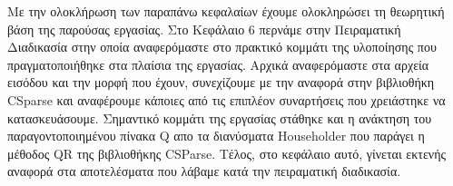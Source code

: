 Με την ολοκλήρωση των παραπάνω κεφαλαίων έχουμε ολοκληρώσει τη θεωρητική βάση της παρούσας εργασίας. Στο Κεφάλαιο 6 περνάμε στην Πειραματική Διαδικασία στην οποία αναφερόμαστε στο πρακτικό κομμάτι της υλοποίησης που πραγματοποιήθηκε στα πλαίσια της εργασίας. Αρχικά αναφερόμαστε στα αρχεία εισόδου και την μορφή που έχουν, συνεχίζουμε με την αναφορά στην βιβλιοθήκη \textlatin{CSparse} και αναφέρουμε κάποιες από τις επιπλέον συναρτήσεις που χρειάστηκε να κατασκευάσουμε. Σημαντικό κομμάτι της εργασίας στάθηκε και η ανάκτηση του παραγοντοποιημένου πίνακα \textlatin{Q} απο τα διανύσματα \textlatin{Householder} που παράγει η μέθοδος \textlatin{QR} της βιβλιοθήκης \textlatin{CSParse}. Τέλος, στο κεφάλαιο αυτό, γίνεται εκτενής αναφορά στα αποτελέσματα που λάβαμε κατά την πειραματική διαδικασία.

